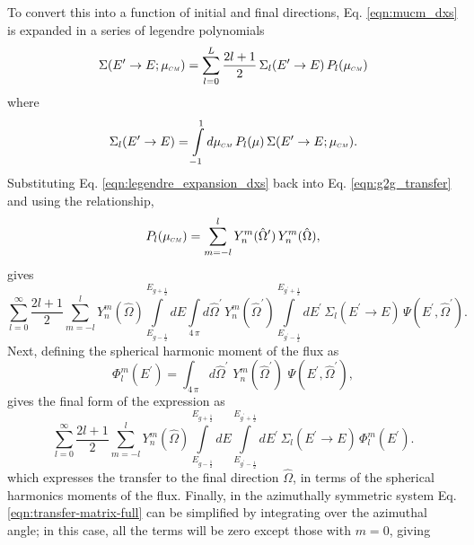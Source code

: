 To convert this into a function of initial and final directions, Eq. \eqref{eqn:mucm_dxs} is expanded in a series of legendre polynomials
\begin{equation} \label{eqn:legendre_expansion_dxs}
  \Sigma(E^{\prime}\rightarrow E; \mucm) = \sum_{l=0}^L \dfrac{2l+1}{2} \, \Sigma_l(E^{\prime}\rightarrow E) \, P_l(\mucm)
\end{equation}
where
\begin{equation}
  \Sigma_l(E^{\prime}\rightarrow E) = \int\limits_{-1}^{1} d\mucm \, P_l(\mu) \, \Sigma(E^{\prime}\rightarrow E; \mucm).
\end{equation}
Substituting Eq. \eqref{eqn:legendre_expansion_dxs} back into Eq. \eqref{eqn:g2g_transfer} and using the relationship,
\begin{equation}
  P_l(\mucm) = \sum\limits_{m=-l}^l Y_{n}^{m}(\hat{\Omega}^{\prime}) \, Y_{n}^{m}(\hat{\Omega}),
\end{equation}
gives
\begin{equation}
  \sum_{l=0}^{\infty} \dfrac{2l+1}{2} \sum\limits_{m=-l}^l Y_{n}^{m}(\hat{\Omega}) \int\limits_{E_{g-\frac{1}{2}}}^{E_{g+\frac{1}{2}}} dE \int\limits_{4 \, \pi} d\hat{\Omega}^{\prime} \, Y_{n}^{m}(\hat{\Omega}^{\prime}) \int\limits_{E_{g^{\prime}-\frac{1}{2}}}^{E_{g^{\prime}+\frac{1}{2}}} dE^{\prime} \, \Sigma_l(E^{\prime}\rightarrow E) \, \Psi(E^{\prime},\hat{\Omega}^{\prime}).
\end{equation}
Next, defining the spherical harmonic moment of the flux as
\begin{equation}
  \Phi_l^m(E^{\prime}) = \int_{4\,\pi} d\hat{\Omega}^{\prime} \,\, Y_{n}^{m}(\hat{\Omega}^{\prime}) \,\, \Psi(E^{\prime},\hat{\Omega}^{\prime}),
\end{equation}
gives the final form of the expression as
\begin{equation} \label{eqn:transfer-matrix-full}
  \sum_{l=0}^{\infty} \dfrac{2l+1}{2} \sum\limits_{m=-l}^l Y_{n}^{m}(\hat{\Omega}) \int\limits_{E_{g-\frac{1}{2}}}^{E_{g+\frac{1}{2}}} dE \int\limits_{E_{g^{\prime}-\frac{1}{2}}}^{E_{g^{\prime}+\frac{1}{2}}} dE^{\prime} \, \Sigma_l(E^{\prime}\rightarrow E) \, \Phi_l^m(E^{\prime}).
\end{equation}
which expresses the transfer to the final direction $\hat{\Omega}$, in terms of the spherical harmonics moments of the flux. Finally, in the azimuthally symmetric system Eq. \eqref{eqn:transfer-matrix-full} can be simplified by integrating over the azimuthal angle; in this case, all the terms will be zero except those with $m = 0$, giving
